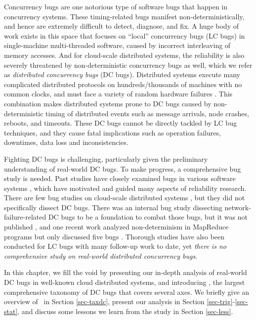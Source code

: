
Concurrency bugs are one notorious type of software bugs that happen in
concurrency systems. These timing-related bugs manifest non-deterministically,
and hence are extremely difficult to detect, diagnose, and fix. A huge body of
work exists in this space that focuses on ``local'' concurrency bugs (LC bugs)
in single-machine multi-threaded software, caused by incorrect interleaving of
memory accesses. And for cloud-scale distributed systems, the reliability is
also severely threatened by non-deterministic concurrency bugs as well, which
we refer as {\em distributed concurrency bugs} (DC bugs). Distributed systems
execute many complicated distributed protocols on hundreds/thousands of
machines with no common clocks, and must face a variety of random hardware
failures \cite{Do+13-Limplock, Gunawi+14-Cbs}. This combination makes
distributed systems prone to DC bugs caused by non-deterministic timing of
distributed events such as message arrivals, node crashes, reboots, and
timeouts. These DC bugs cannot be directly tackled by LC bug techniques, and
they cause fatal implications such as operation failures, downtimes, data loss
and inconsistencies.

Fighting DC bugs is challenging, particularly given the preliminary
understanding of real-world DC bugs.  To make progress, a comprehensive bug
study is needed. Past studies have closely examined bugs in various software
systems \cite{Chou+01-Empirical, Lu+13-FsEvolution, linux.asplos11}, which have
motivated and guided many aspects of reliability research.
%
There are few bug studies on cloud-scale distributed systems
\cite{Gunawi+14-Cbs, Li+13-ScopeBugStudy}, but they did not specifically dissect
DC bugs. There was an internal bug study dissecting network-failure-related DC
bugs to be a foundation to combat those bugs, but it was not published
\cite{Joshi+13-SetsudoTesting}, and one recent work analyzed non-determinism in
MapReduce programs but only discussed five bugs \cite{Xiao+14-NonDetMR}.
%
Thorough studies have also been conducted for LC bugs \cite{study.dsn10,
Lu+08-ConcurrencyBugStudy} with many follow-up work to date, yet {\em there is
no comprehensive study on real-world distributed concurrency bugs}. 

In this chapter, we fill the void by presenting our in-depth analysis of
real-world DC bugs in well-known cloud distributed systems, and introducing
\taxdc, the largest comprehensive taxonomy of DC bugs that covers several axes.
We briefly give an overview of \taxdc\ in Section \ref{sec-taxdc}, present our
analysis in Section \ref{sec-trig}-\ref{sec-stat}, and discuss some lessons we
learn from the study in Section \ref{sec-less}.

